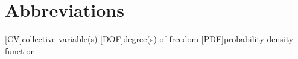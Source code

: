 \section*{Abbreviations}

\def\aclabelfont#1{\textsc{\MakeLowercase{#1}}}

\begin{acronym}[XXX~~~]\baselineskip
  [CV]{collective variable(s)}
  [DOF]{degree(s) of freedom}
  [PDF]{probability density function}
\end{acronym}
